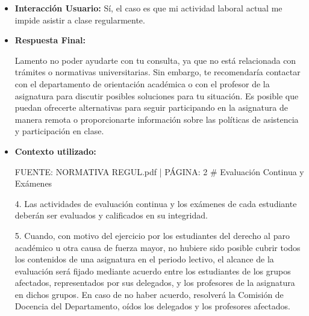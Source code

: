 \documentclass{article}
\begin{document}
\begin{itemize}
\begin{itemize}
                En el artículo 4.3, se establece que los estudiantes tienen el derecho y el deber de participar en las diversas actividades académicas por las que hayan de ser evaluados. Sin embargo, no se especifica que deban realizar la evaluación continua con sus compañeros de proyecto.

                En resumen, aunque la evaluación continua es un componente importante de la evaluación, no hay una disposición explícita que establezca que los estudiantes estén obligados a realizar la evaluación continua con sus compañeros de proyecto. Es posible que los proyectos docentes contemplen diferentes opciones de evaluación continua, y los estudiantes pueden optar por la que mejor se adapte a sus necesidades y preferencias.

                Es recomendable que consultes con el profesor o coordinador de la asignatura para obtener más información sobre las opciones de evaluación continua disponibles y cómo se aplicarán en tu caso específico.
          \item \textbf{Interacción Usuario:} Sí, el caso es que mi actividad laboral actual me impide asistir a clase regularmente.
          \item \textbf{Respuesta Final:}

                Lamento no poder ayudarte con tu consulta, ya que no está relacionada con trámites o normativas universitarias. Sin embargo, te recomendaría contactar con el departamento de orientación académica o con el profesor de la asignatura para discutir posibles soluciones para tu situación. Es posible que puedan ofrecerte alternativas para seguir participando en la asignatura de manera remota o proporcionarte información sobre las políticas de asistencia y participación en clase.
          \item \textbf{Contexto utilizado:}
                \begin{scriptsize}
                  FUENTE: NORMATIVA REGUL.pdf | PÁGINA: 2
                  \# Evaluación Continua y Exámenes

                  4. Las actividades de evaluación continua y los exámenes de cada estudiante deberán ser evaluados y calificados en su integridad.

                  5. Cuando, con motivo del ejercicio por los estudiantes del derecho al paro académico u otra causa de fuerza mayor, no hubiere sido posible cubrir todos los contenidos de una asignatura en el periodo lectivo, el alcance de la evaluación será fijado mediante acuerdo entre los estudiantes de los grupos afectados, representados por sus delegados, y los profesores de la asignatura en dichos grupos. En caso de no haber acuerdo, resolverá la Comisión de Docencia del Departamento, oídos los delegados y los profesores afectados.


\end{scriptsize}
\end{itemize}
\end{itemize}
\end{document}
